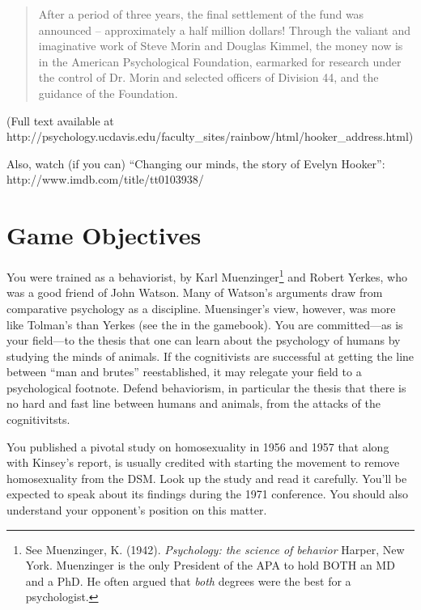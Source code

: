 \begin{refsection}
\begin{quote}
After a period of three years, the final settlement of the fund was announced – approximately a half million dollars! Through the valiant and imaginative work of Steve Morin and Douglas Kimmel, the money now is in the American Psychological Foundation, earmarked for research under the control of Dr. Morin and selected officers of Division 44, and the guidance of the Foundation.
\end{quote}

(Full text available at http:\slash \slash psychology.ucdavis.edu\slash faculty\_sites\slash rainbow\slash html\slash hooker\_address.html) 

Also, watch (if you can) ``Changing our minds, the story of Evelyn Hooker'': http:\slash \slash www.imdb.com\slash title\slash tt0103938\slash 

\section{Game Objectives}
\label{gameobjectives}

You were trained as a behaviorist, by Karl Muenzinger\footnote{See Muenzinger, K. (1942). \emph{Psychology: the science of behavior} Harper, New York. Muenzinger is the only President of the APA to hold BOTH an MD and a PhD. He often argued that \emph{both} degrees were the best for a psychologist.} and Robert Yerkes, who was a good friend of John Watson. Many of Watson's arguments draw from comparative psychology as a discipline. Muensinger's view, however, was more like Tolman's than Yerkes (see the  in the gamebook). You are committed---as is your field---to the thesis that one can learn about the psychology of humans by studying the minds of animals. If the cognitivists are successful at getting the line between ``man and brutes'' reestablished, it may relegate your field to a psychological footnote. Defend behaviorism, in particular the thesis that there is no hard and fast line between humans and animals, from the attacks of the cognitivitsts.

You published a pivotal study on homosexuality in 1956 and 1957 that along with Kinsey's report, is usually credited with starting the movement to remove homosexuality from the DSM. Look up the study and read it carefully. You'll be expected to speak about its findings during the 1971 conference. You should also understand your opponent's position on this matter.


\end{refsection}
